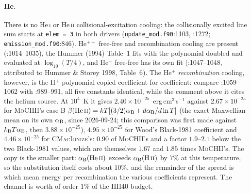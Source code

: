 \documentclass[english,a4paper]{my_memo}
\newcommand{\code}[1]{\texttt{#1}}
\newcommand{\MoCHII}{\textsc{MoCHII}}
\newcommand{\CMI}{\textsc{CMacIonize}}
\newcommand{\HeI}{He\,\textsc{i}}
\newcommand{\HeII}{He\,\textsc{ii}}
\begin{document}
\paragraph{He.}  There is no \HeI{} or \HeII{} collisional-excitation cooling:
the collisionally excited line sum starts at \code{elem = 3} in both drivers
(\code{update\_mod.f90}:1103, :1272; \code{emission\_mod.f90}:846).  He$^{++}$
free-free and recombination cooling are present (:1014--1035), the Hummer
(1994) Table~1 fits with the polynomial doubled and evaluated at
$\log_{10}(T/4)$, and He$^{+}$ free-free has its own fit (:1047--1048,
attributed to Hummer \& Storey 1998, Table~6).  The He$^{+}$ \emph{recombination}
cooling, however, is the H$^{+}$ polynomial copied coefficient for coefficient:
compare :1059--1062 with :989--991, all five constants identical, while the
comment above it cites the helium source.  At $10^4$~K it gives
$2.40\times10^{-25}$~erg\,cm$^3$\,s$^{-1}$ against $2.67\times10^{-25}$ for
\MoCHII{}'s case-B $\beta({\rm He\,\textsc{ii}}) = kT[(3/2)\alpha_{\rm B} +
d\alpha_{\rm B}/d\ln T]$ (the exact Maxwellian mean on its own $\alpha_{\rm B}$,
since 2026-09-24; this comparison was first made against
$k_{\rm B}T\alpha_{\rm B}$, then $3.88\times10^{-25}$),
$4.95\times10^{-25}$ for Wood's Black-1981 coefficient and
$4.46\times10^{-25}$ for \CMI{}'s: $0.90$ of \MoCHII{}'s and a factor
$1.9$--$2.1$ below the two Black-1981 values, which are themselves $1.67$ and
$1.85$ times \MoCHII{}'s.  The copy is the smaller part:
$\alpha_{\rm B}({\rm He\,\textsc{ii}})$ exceeds
$\alpha_{\rm B}({\rm H\,\textsc{ii}})$ by $7\%$ at this temperature, so the
substitution itself costs about $10\%$, and the remainder of the spread is which
mean energy per recombination the various coefficients represent.  The channel
is worth of order $1\%$ of the HII40 budget.
\end{document}
